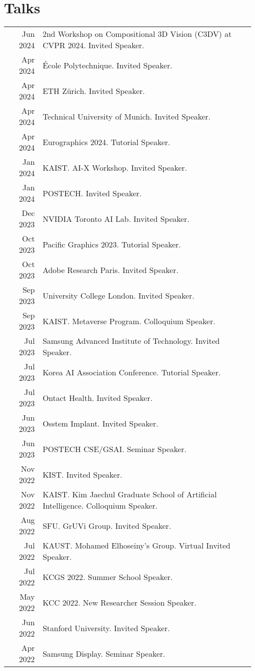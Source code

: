 \documentclass[letterpaper,10pt]{article} %
\begin{document}
{\section{Talks}
\begin{tabular}{r|p{11cm}}
Jun 2024 & 2nd Workshop on Compositional 3D Vision (C3DV) at CVPR 2024. Invited Speaker.\\
Apr 2024 & \'Ecole Polytechnique. Invited Speaker.\\
Apr 2024 & ETH Z\"urich. Invited Speaker.\\
Apr 2024 & Technical University of Munich. Invited Speaker.\\
Apr 2024 & Eurographics 2024. Tutorial Speaker.\\
Jan 2024 & KAIST. AI-X Workshop. Invited Speaker.\\
Jan 2024 & POSTECH. Invited Speaker.\\
Dec 2023 & NVIDIA Toronto AI Lab. Invited Speaker.\\
Oct 2023 & Pacific Graphics 2023. Tutorial Speaker.\\
Oct 2023 & Adobe Research Paris. Invited Speaker.\\
Sep 2023 & University College London. Invited Speaker.\\
Sep 2023 & KAIST. Metaverse Program. Colloquium Speaker.\\
Jul 2023 & Samsung Advanced Institute of Technology. Invited Speaker.\\
Jul 2023 & Korea AI Association Conference. Tutorial Speaker.\\
Jul 2023 & Ontact Health. Invited Speaker.\\
Jun 2023 & Osstem Implant. Invited Speaker.\\
Jun 2023 & POSTECH CSE/GSAI. Seminar Speaker.\\
Nov 2022 & KIST. Invited Speaker.\\
Nov 2022 & KAIST. Kim Jaechul Graduate School of Artificial Intelligence. Colloquium Speaker.\\
Aug 2022 & SFU. GrUVi Group. Invited Speaker.\\
Jul 2022 & KAUST. Mohamed Elhoseiny's Group. Virtual Invited Speaker.\\
Jul 2022 & KCGS 2022. Summer School Speaker. \\
May 2022 & KCC 2022. New Researcher Session Speaker.\\
Jun 2022 & Stanford University. Invited Speaker.\\
Apr 2022 & Samsung Display. Seminar Speaker.\\

\end{tabular}}
\end{document}
